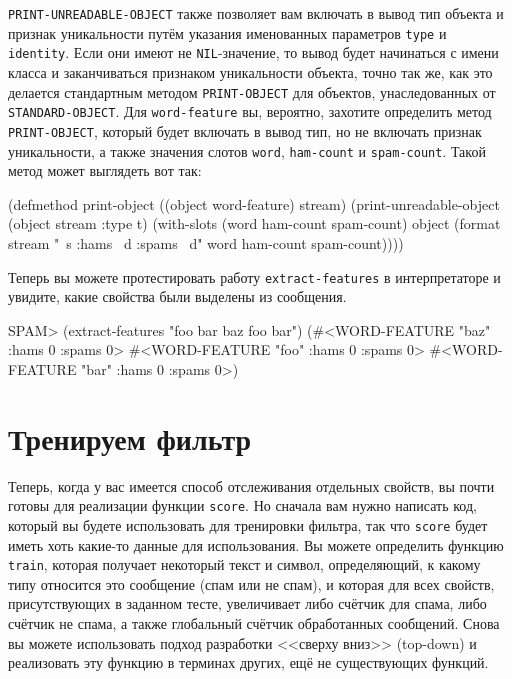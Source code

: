 \lstinline{PRINT-UNREADABLE-OBJECT} также позволяет вам включать в вывод тип объекта и признак
уникальности путём указания именованных параметров \lstinline{type} и
\lstinline{identity}.  Если они имеют не \lstinline{NIL}-значение, то вывод будет начинаться с имени
класса и заканчиваться признаком уникальности объекта, точно так же, как
это делается стандартным методом \lstinline{PRINT-OBJECT} для объектов, унаследованных от
\lstinline{STANDARD-OBJECT}.  Для \lstinline{word-feature} вы, вероятно, захотите определить метод
\lstinline{PRINT-OBJECT}, который будет включать в вывод тип, но не включать признак
уникальности, а также значения слотов \lstinline{word}, \lstinline{ham-count} и
\lstinline{spam-count}.  Такой метод может выглядеть вот так:

\begin{myverb}
(defmethod print-object ((object word-feature) stream)
  (print-unreadable-object (object stream :type t)
    (with-slots (word ham-count spam-count) object
      (format stream "~s :hams ~d :spams ~d" word ham-count spam-count))))
\end{myverb}

Теперь вы можете протестировать работу \lstinline{extract-features} в интерпретаторе и увидите,
какие свойства были выделены из сообщения.

\begin{myverb}
  SPAM> (extract-features "foo bar baz foo bar")
  (#<WORD-FEATURE "baz" :hams 0 :spams 0>
   #<WORD-FEATURE "foo" :hams 0 :spams 0>
   #<WORD-FEATURE "bar" :hams 0 :spams 0>)
\end{myverb}

\section{Тренируем фильтр}

Теперь, когда у вас имеется способ отслеживания отдельных свойств, вы почти готовы для
реализации функции \lstinline{score}.  Но сначала вам нужно написать код, который вы будете
использовать для тренировки фильтра, так что \lstinline{score} будет иметь хоть какие-то данные
для использования.  Вы можете определить функцию \lstinline{train}, которая получает некоторый
текст и символ, определяющий, к какому типу относится это сообщение (спам или не спам), и
которая для всех свойств, присутствующих в заданном тесте, увеличивает либо счётчик для
спама, либо счётчик не спама, а также глобальный счётчик обработанных сообщений.  Снова
вы можете использовать подход разработки <<сверху вниз>> (top-down) и реализовать эту
функцию в терминах других, ещё не существующих функций.

